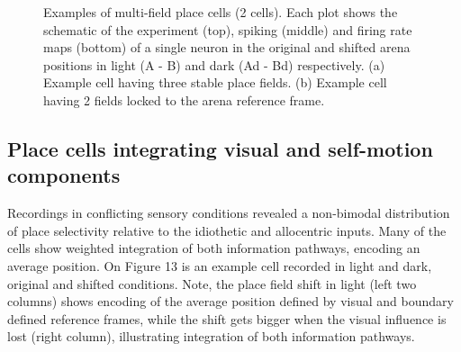\begin{figure}
\captionsetup{format=plain}
\caption[Multi-field place cells]{
Examples of multi-field place cells (2 cells). Each plot shows the schematic of the experiment (top), spiking (middle) and firing rate maps (bottom) of a single neuron in the original and shifted arena positions in light (A - B) and dark (Ad - Bd) respectively. (a) Example cell having three stable place fields. (b) Example cell having 2 fields locked to the arena reference frame.
}
\label{fig:F12_multi_field_cells}
\end{figure}


\subsection{Place cells integrating visual and self-motion components}

Recordings in conflicting sensory conditions revealed a non-bimodal distribution of place selectivity relative to the idiothetic and allocentric inputs. Many of the cells show weighted integration of both information pathways, encoding an average position. On Figure 13 is an example cell recorded in light and dark, original and shifted conditions. Note, the place field shift in light (left two columns) shows encoding of the average position defined by visual and boundary defined reference frames, while the shift gets bigger when the visual influence is lost (right column), illustrating integration of both information pathways.

